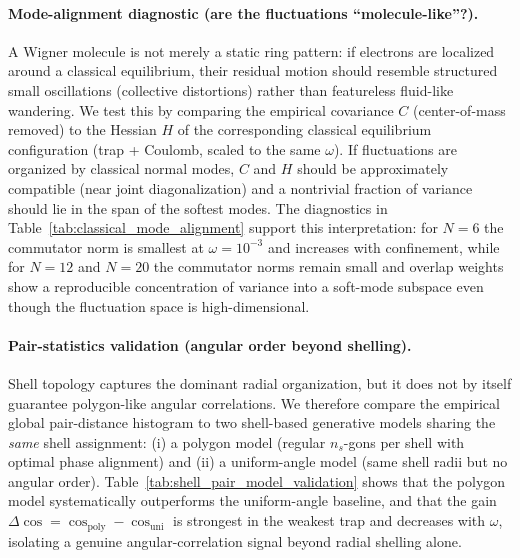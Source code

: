 \documentclass[superscriptaddress,unsortedaddress,amsmath,amssymb,aps]{revtex4-2}
\begin{document}
\paragraph{Mode-alignment diagnostic (are the fluctuations ``molecule-like''?).}
A Wigner molecule is not merely a static ring pattern: if electrons are localized around a classical equilibrium,
their residual motion should resemble structured small oscillations (collective distortions) rather than featureless
fluid-like wandering. We test this by comparing the empirical covariance $C$ (center-of-mass removed) to the Hessian
$H$ of the corresponding classical equilibrium configuration (trap + Coulomb, scaled to the same $\omega$). If
fluctuations are organized by classical normal modes, $C$ and $H$ should be approximately compatible (near joint
diagonalization) and a nontrivial fraction of variance should lie in the span of the softest modes. The diagnostics
in Table~\ref{tab:classical_mode_alignment} support this interpretation: for $N=6$ the commutator norm is smallest at
$\omega=10^{-3}$ and increases with confinement, while for $N=12$ and $N=20$ the commutator norms remain small and
overlap weights show a reproducible concentration of variance into a soft-mode subspace even though the fluctuation
space is high-dimensional.


\paragraph{Pair-statistics validation (angular order beyond shelling).}
Shell topology captures the dominant radial organization, but it does not by itself guarantee polygon-like angular
correlations. We therefore compare the empirical global pair-distance histogram to two shell-based generative models
sharing the \emph{same} shell assignment: (i) a polygon model (regular $n_s$-gons per shell with optimal phase alignment)
and (ii) a uniform-angle model (same shell radii but no angular order). Table~\ref{tab:shell_pair_model_validation}
shows that the polygon model systematically outperforms the uniform-angle baseline, and that the gain
$\Delta\cos=\cos_{\mathrm{poly}}-\cos_{\mathrm{uni}}$ is strongest in the weakest trap and decreases with $\omega$,
isolating a genuine angular-correlation signal beyond radial shelling alone.
\end{document}
